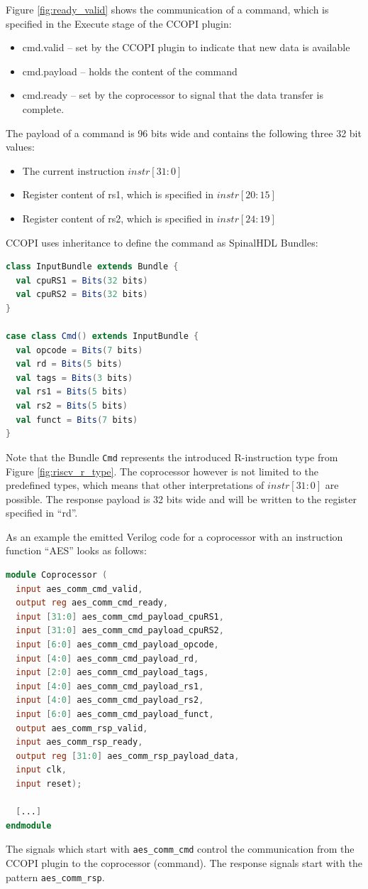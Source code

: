 \documentclass[twoside,twocolumn]{article}
\newcommand{\code}[1]{\texttt{#1}}
\begin{document}
Figure \ref*{fig:ready_valid} shows the communication of a command,
which is specified in the Execute stage of the CCOPI plugin:
\begin{itemize}
    \item cmd.valid -- set by the CCOPI plugin to indicate that new data
        is available
    \item cmd.payload -- holds the content of the command
    \item cmd.ready -- set by the coprocessor to signal that the data
        transfer is complete.
\end{itemize}
The payload of a command is 96 bits wide and contains the following
three 32 bit values:
\begin{itemize}
    \item The current instruction $instr[31:0]$
    \item Register content of rs1, which is specified in $instr[20:15]$
    \item Register content of rs2, which is specified in $instr[24:19]$
\end{itemize}
CCOPI uses inheritance to define the command as SpinalHDL Bundles:
\begin{lstlisting}[language=scala]
class InputBundle extends Bundle {
  val cpuRS1 = Bits(32 bits)
  val cpuRS2 = Bits(32 bits)
}

case class Cmd() extends InputBundle {
  val opcode = Bits(7 bits)
  val rd = Bits(5 bits)
  val tags = Bits(3 bits)
  val rs1 = Bits(5 bits)
  val rs2 = Bits(5 bits)
  val funct = Bits(7 bits)
}
\end{lstlisting}
Note that the Bundle \code{Cmd} represents the introduced R-instruction type from Figure \ref*{fig:riscv_r_type}. The coprocessor
however is not limited to the predefined types, which means
that other interpretations of $instr[31:0]$ are possible.
The response payload is 32 bits wide and will be written to the register
specified in ``rd''.

As an example the emitted Verilog code for a coprocessor with an instruction 
function ``AES'' looks as follows:
\begin{lstlisting}[language=Verilog]
module Coprocessor (
  input aes_comm_cmd_valid,
  output reg aes_comm_cmd_ready,
  input [31:0] aes_comm_cmd_payload_cpuRS1,
  input [31:0] aes_comm_cmd_payload_cpuRS2,
  input [6:0] aes_comm_cmd_payload_opcode,
  input [4:0] aes_comm_cmd_payload_rd,
  input [2:0] aes_comm_cmd_payload_tags,
  input [4:0] aes_comm_cmd_payload_rs1,
  input [4:0] aes_comm_cmd_payload_rs2,
  input [6:0] aes_comm_cmd_payload_funct,
  output aes_comm_rsp_valid,
  input aes_comm_rsp_ready,
  output reg [31:0] aes_comm_rsp_payload_data,
  input clk,
  input reset);

  [...]
endmodule
\end{lstlisting}
The signals which start with \code{aes\_comm\_cmd} control the
communication from the CCOPI plugin to the coprocessor (command). The
response signals start with the pattern \code{aes\_comm\_rsp}.
\end{document}
